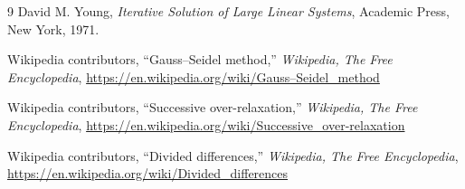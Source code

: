 \documentclass[12pt,a4paper]{ltjsreport}
\begin{document}
\begin{thebibliography}{9}
David M. Young,
\emph{Iterative Solution of Large Linear Systems},
Academic Press, New York, 1971.

Wikipedia contributors,
``Gauss–Seidel method,'' \emph{Wikipedia, The Free Encyclopedia},
\url{https://en.wikipedia.org/wiki/Gauss–Seidel_method}

Wikipedia contributors,
``Successive over-relaxation,'' \emph{Wikipedia, The Free Encyclopedia},
\url{https://en.wikipedia.org/wiki/Successive_over-relaxation}

Wikipedia contributors,
``Divided differences,'' \emph{Wikipedia, The Free Encyclopedia},
\url{https://en.wikipedia.org/wiki/Divided_differences}
\end{thebibliography}
\end{document}
